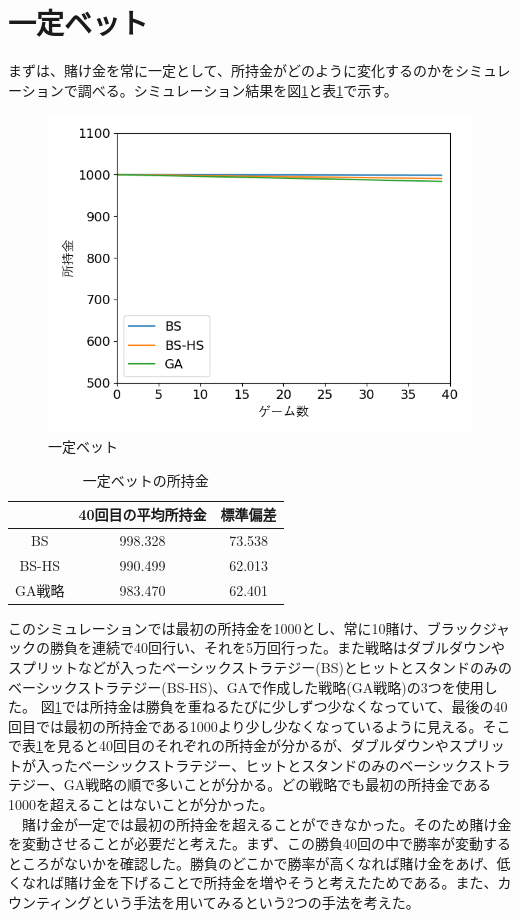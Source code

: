 \section{一定ベット}
まずは、賭け金を常に一定として、所持金がどのように変化するのかをシミュレーションで調べる。シミュレーション結果を図\ref{betdife}と表\ref{bet}で示す。
\begin{figure}[H]
 \begin{center} 
  \includegraphics[width=0.7\linewidth]{./figure/betsimulation-bet-defineite-ver5}
  \caption{一定ベット\label{betdife}}
 \end{center}
\end{figure}

\begin{table}[H]
 \caption{一定ベットの所持金\label{bet}}
 \begin{center}
  \begin{tabular}{|c|c|c|}
  \hline  & 40回目の平均所持金 & 標準偏差 \\
  \hline BS & 998.328 & 73.538\\
  \hline BS-HS & 990.499 & 62.013 \\
  \hline GA戦略 & 983.470 & 62.401\\
  \hline
  \end{tabular}
 \end{center}
\end{table}

このシミュレーションでは最初の所持金を1000とし、常に10賭け、ブラックジャックの勝負を連続で40回行い、それを5万回行った。また戦略はダブルダウンやスプリットなどが入ったベーシックストラテジー(BS)とヒットとスタンドのみのベーシックストラテジー(BS-HS)、GAで作成した戦略(GA戦略)の3つを使用した。
 図\ref{betdife}では所持金は勝負を重ねるたびに少しずつ少なくなっていて、最後の40回目では最初の所持金である1000より少し少なくなっているように見える。そこで表\ref{bet}を見ると40回目のそれぞれの所持金が分かるが、ダブルダウンやスプリットが入ったベーシックストラテジー、ヒットとスタンドのみのベーシックストラテジー、GA戦略の順で多いことが分かる。どの戦略でも最初の所持金である1000を超えることはないことが分かった。\\
　賭け金が一定では最初の所持金を超えることができなかった。そのため賭け金を変動させることが必要だと考えた。まず、この勝負40回の中で勝率が変動するところがないかを確認した。勝負のどこかで勝率が高くなれば賭け金をあげ、低くなれば賭け金を下げることで所持金を増やそうと考えたためである。また、カウンティングという手法を用いてみるという2つの手法を考えた。

